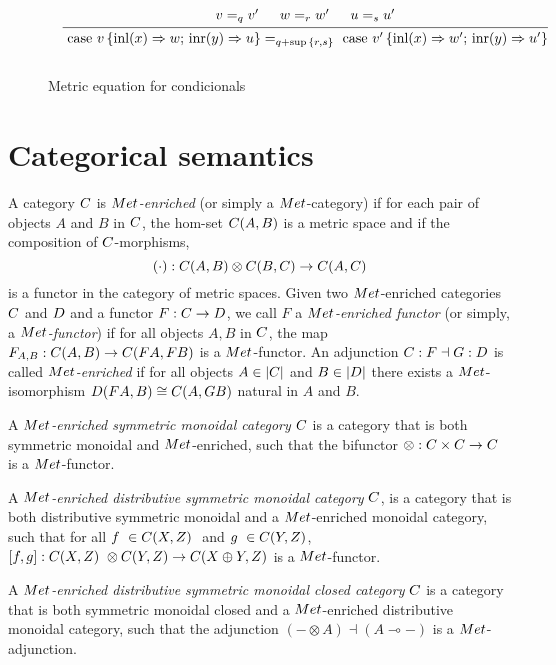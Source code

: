 \documentclass[a4paper,UKenglish,cleveref, autoref, thm-restate]{lipics-v2021}
\begin{document}
\begin{figure}[H]
  \begin{equation*}
  \begin{aligned}
  &
  &
  \begin{prooftree}
      \hypo{ v =_{q} v' }
      \hypo{w=_{r} w'}
      \hypo{u=_{s}u'}
      \infer3[]{\text{ case } v \,   \{\text{inl} (x) \Rightarrow w ; \, \text{inr} (y) \Rightarrow u\} =_{q+\sup{\{ r, s \}}} \text{ case } v' \,  \{\text{inl} (x) \Rightarrow w' ; \,\text{inr} (y) \Rightarrow u'\} }
  \end{prooftree}
  \\[10pt]
  \end{aligned}
  \end{equation*}
  \caption{Metric equation for condicionals}
  \label{fig:metric conditionals}
\end{figure}


\section{Categorical semantics}
\begin{definition}
 A category $\catC$ is $\catMet$\emph{-enriched} (or simply a $\catMet$-category) if for each pair of objects $A$ and $B$ in $\catC$, the hom-set $\catC(A, B)$ is a metric space and if the composition of $\catC$-morphisms,
 $$(\comp): \catC(A, B) \otimes \catC(B, C) \rightarrow \catC(A, C)$$
 is a functor in the category of metric spaces. 
 Given two $\catMet$-enriched categories $\catC$ and $\catD$ and a functor $F : \catC\to \catD$, we call 
$F$ a \emph{$\catMet$-enriched functor} (or simply, a \emph{$\catMet$-functor}) if for all objects $A, B$ in $\catC$, 
the map $F_{A,B} : \catC(A,B) \to \catC(FA, FB)$ is a $\catMet$-functor. 
An adjunction $\catC : F \dashv G : \catD$ is called \emph{$\catMet$-enriched} if for all objects $A \in |\catC|$ 
and $B \in |\catD|$ there exists a $\catMet$-isomorphism
$\catD(FA, B) \cong \catC(A, GB)$
natural in $A$ and $B$.
\end{definition}


\begin{definition}
A \emph{$\catMet$-enriched symmetric monoidal category} $\catC$ is a category that is both symmetric monoidal and $\catMet$-enriched, such that the bifunctor
$\otimes : \catC \times \catC \to \catC$
is a $\catMet$-functor. 

A  \emph{$\catMet$-enriched distributive symmetric monoidal category} $\catC$, is a category that is both distributive symmetric monoidal and a $\catMet$-enriched monoidal category, such that for all $f  \in \catC(X,Z)  $ and $g  \in \catC(Y,Z) $, $ [f,g]:\catC(X,Z)  \otimes \catC(Y,Z) \rightarrow \catC(X \oplus Y,Z) $ is a $\catMet$-functor.

A \emph{$\catMet$-enriched distributive symmetric monoidal closed category} $\catC$ is a category that is both symmetric monoidal closed and a $\catMet$-enriched distributive monoidal category, such that the adjunction
$(- \otimes A) \dashv (A \multimap -)$
is a $\catMet$-adjunction.
\end{definition}
\end{document}
